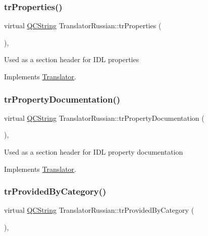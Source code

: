 \subsubsection{\texorpdfstring{trProperties()}{trProperties()}}
{\footnotesize\ttfamily virtual \mbox{\hyperlink{class_q_c_string}{Q\+C\+String}} Translator\+Russian\+::tr\+Properties (\begin{DoxyParamCaption}{ }\end{DoxyParamCaption})\hspace{0.3cm}{\ttfamily [inline]}, {\ttfamily [virtual]}}

Used as a section header for I\+DL properties 

Implements \mbox{\hyperlink{class_translator}{Translator}}.

\mbox{\label{class_translator_russian_ae21adcf8e5c3ebcd26cb4795d5e4b19d}} 
\subsubsection{\texorpdfstring{trPropertyDocumentation()}{trPropertyDocumentation()}}
{\footnotesize\ttfamily virtual \mbox{\hyperlink{class_q_c_string}{Q\+C\+String}} Translator\+Russian\+::tr\+Property\+Documentation (\begin{DoxyParamCaption}{ }\end{DoxyParamCaption})\hspace{0.3cm}{\ttfamily [inline]}, {\ttfamily [virtual]}}

Used as a section header for I\+DL property documentation 

Implements \mbox{\hyperlink{class_translator}{Translator}}.

\mbox{\label{class_translator_russian_aa0f4c6d57fd3a9414c20697105fea70a}} 
\subsubsection{\texorpdfstring{trProvidedByCategory()}{trProvidedByCategory()}}
{\footnotesize\ttfamily virtual \mbox{\hyperlink{class_q_c_string}{Q\+C\+String}} Translator\+Russian\+::tr\+Provided\+By\+Category (\begin{DoxyParamCaption}{ }\end{DoxyParamCaption})\hspace{0.3cm}{\ttfamily [inline]}, {\ttfamily [virtual]}}

